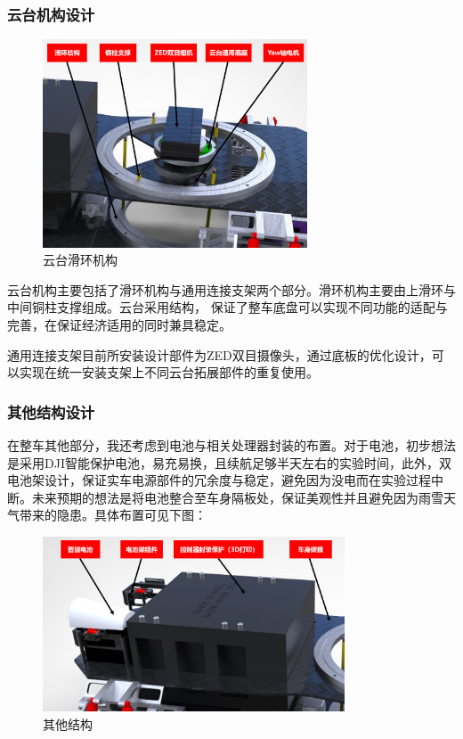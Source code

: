 \subsubsection{云台机构设计}

\begin{figure}[htbp]
	\centering
	\includegraphics[width = 0.7\textwidth]{fig/ytjg.png}
	\caption{云台滑环机构}
	\label{ytjg}
\end{figure}

云台机构主要包括了滑环机构与通用连接支架两个部分。滑环机构主要由上滑环与中间铜柱支撑组成。云台采用结构， 保证了整车底盘可以实现不同功能的适配与完善，在保证经济适用的同时兼具稳定。

通用连接支架目前所安装设计部件为ZED双目摄像头，通过底板的优化设计，可以实现在统一安装支架上不同云台拓展部件的重复使用。
\\

\subsubsection{其他结构设计}

在整车其他部分，我还考虑到电池与相关处理器封装的布置。对于电池，初步想法是采用DJI智能保护电池，易充易换，且续航足够半天左右的实验时间，此外，双电池架设计，保证实车电源部件的冗余度与稳定，避免因为没电而在实验过程中断。未来预期的想法是将电池整合至车身隔板处，保证美观性并且避免因为雨雪天气带来的隐患。具体布置可见下图：

\begin{figure}[htbp]
	\centering
	\includegraphics[width = 0.8\textwidth]{fig/qtjg.png}
	\caption{其他结构}
	\label{qtjg}
\end{figure}


